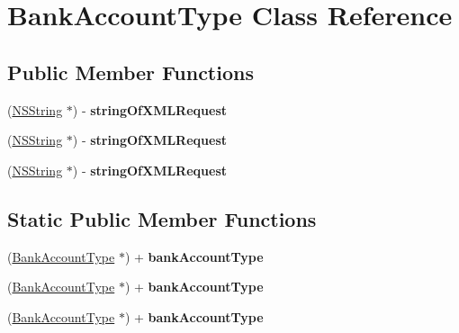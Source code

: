 \hypertarget{interface_bank_account_type}{
\section{BankAccountType Class Reference}
\label{interface_bank_account_type}
}
\subsection*{Public Member Functions}
\begin{DoxyCompactItemize}
\item 
\hypertarget{interface_bank_account_type_a718fca5cf42569010432011f58b9663f}{
(\hyperlink{class_n_s_string}{NSString} $\ast$) -\/ {\bfseries stringOfXMLRequest}}
\label{interface_bank_account_type_a718fca5cf42569010432011f58b9663f}

\item 
\hypertarget{interface_bank_account_type_a718fca5cf42569010432011f58b9663f}{
(\hyperlink{class_n_s_string}{NSString} $\ast$) -\/ {\bfseries stringOfXMLRequest}}
\label{interface_bank_account_type_a718fca5cf42569010432011f58b9663f}

\item 
\hypertarget{interface_bank_account_type_a718fca5cf42569010432011f58b9663f}{
(\hyperlink{class_n_s_string}{NSString} $\ast$) -\/ {\bfseries stringOfXMLRequest}}
\label{interface_bank_account_type_a718fca5cf42569010432011f58b9663f}

\end{DoxyCompactItemize}
\subsection*{Static Public Member Functions}
\begin{DoxyCompactItemize}
\item 
\hypertarget{interface_bank_account_type_a212a4b6601fd268e3c5bf178f7c5e03c}{
(\hyperlink{interface_bank_account_type}{BankAccountType} $\ast$) + {\bfseries bankAccountType}}
\label{interface_bank_account_type_a212a4b6601fd268e3c5bf178f7c5e03c}

\item 
\hypertarget{interface_bank_account_type_a212a4b6601fd268e3c5bf178f7c5e03c}{
(\hyperlink{interface_bank_account_type}{BankAccountType} $\ast$) + {\bfseries bankAccountType}}
\label{interface_bank_account_type_a212a4b6601fd268e3c5bf178f7c5e03c}

\item 
\hypertarget{interface_bank_account_type_a212a4b6601fd268e3c5bf178f7c5e03c}{
(\hyperlink{interface_bank_account_type}{BankAccountType} $\ast$) + {\bfseries bankAccountType}}
\label{interface_bank_account_type_a212a4b6601fd268e3c5bf178f7c5e03c}

\end{DoxyCompactItemize}
